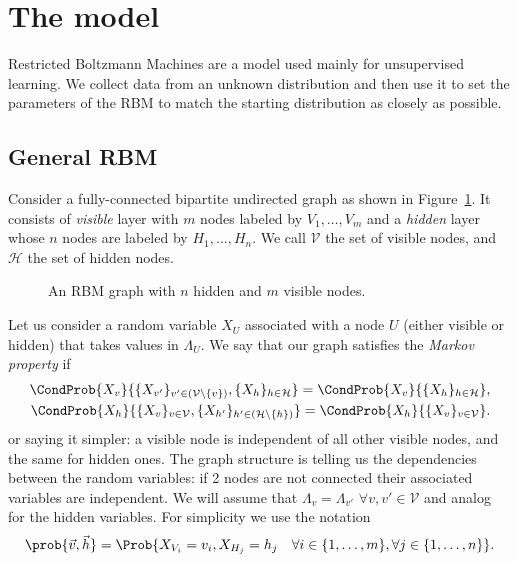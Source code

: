 \section{The model}
  Restricted Boltzmann Machines are a model used mainly for unsupervised learning. We collect
  data from an unknown distribution and then use it to set the parameters of the RBM to match
  the starting distribution as closely as possible.
  
  \subsection{General RBM}
  Consider a fully-connected bipartite undirected graph as shown in Figure~\ref{fig:generalRBM}.
  It consists of \emph{visible} layer with $m$ nodes labeled by \(V_1, \dots, V_m\) and a
  \emph{hidden} layer whose \(n\) nodes are labeled by \(H_1, \dots, H_n\). We call \(\mathcal{V}\)
  the set of visible nodes, and \(\mathcal{H}\) the set of hidden nodes.
  \begin{figure}
    \centering
    \resizebox{0.5\textwidth}{!}{}
    \caption{An RBM graph with \(n\) hidden and \(m\) visible nodes.}
    \label{fig:generalRBM}
  \end{figure}
  Let us consider a random variable \(X_U\) associated with a node \(U\) (either visible or hidden)
  that takes values in \(\Lambda_U\). We say that our graph satisfies the \emph{Markov
  property} if 
  \begin{align*}
    \CondProb{X_v}{\{X_{v'}\}_{v'\in (\mathcal{V} \setminus \{v\})}, \{X_h\}_{h\in \mathcal{H}}} =
    \CondProb{X_v}{\{X_h\}_{h\in \mathcal{H}}}, \\
    \CondProb{X_h}{\{X_v\}_{v\in \mathcal{V}}, \{X_{h'}\}_{h'\in (\mathcal{H} \setminus \{h\})}} =
    \CondProb{X_h}{\{X_v\}_{v\in \mathcal{V}}}.
  \end{align*}
  or saying it simpler: a visible node is independent of all other visible nodes,
  and the same for hidden ones. The graph structure is telling us the dependencies between
  the random variables: if 2 nodes are not connected their associated variables are independent.
  We will assume that \(\Lambda_v = \Lambda_{v'} \,\, \forall v,v' \in \mathcal{V}\) and analog
  for the hidden variables. For simplicity we use the notation
  \[\prob{\vec{v}, \vec{h}} = \Prob{X_{V_i} = v_i, X_{H_j} = h_j
                                    \quad\forall i \in \{1,\dots,m\}, \forall j \in \{1,\dots,n\}}.\]
  
